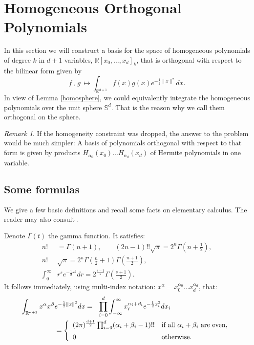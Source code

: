 \documentclass{amsart}
\newcommand{\R}{\mathbb{R}}
\renewcommand{\S}{\mathbb{S}}
\theoremstyle{plain}
\theoremstyle{definition}
\theoremstyle{remark}
\newtheorem{remark}[theorem]{Remark}
\begin{document}
\section{Homogeneous Orthogonal Polynomials}
In this section we will construct a basis for the space of homogeneous polynomials of degree $k$ in $d+1$ variables, $\R[x_0,\ldots,x_d]_k$, that is orthogonal with respect to the bilinear form given by
\begin{equation*}
 f\,,\,g\, \longmapsto \int_{\R^{d+1}}f(x)g(x)e^{-\frac{1}{2}\|x\|^2} dx.
\end{equation*}
In view of Lemma \ref{homosphere}, we could equivalently integrate the homogeneous polynomials over the unit sphere $\S^d$. That is the reason why we call them orthogonal on the sphere.
\begin{remark}
 If the homogeneity constraint was dropped, the answer to the problem would be much simpler: A basis of polynomials orthogonal with respect to that form is given by products $H_{\alpha_0}\!(x_0)\ldots H_{\alpha_d}\!(x_d)$ of Hermite polynomials in one variable.
\end{remark}
\subsection{Some formulas}
We give a few basic definitions and recall some facts on elementary calculus. The reader may also consult \cite{Folland}.

Denote $\Gamma(t)$ the gamma function. It satisfies:
\begin{align}
n!&=\Gamma(n+1),\qquad (2n-1)!!\sqrt{\pi} =2^{n}\Gamma\left(n+\tfrac{1}{2}\right), \\
\label{doublegamma}
n!&\sqrt{\pi}=2^{n}\Gamma\left(\tfrac{n}{2}+1\right)\Gamma\left(\tfrac{n+1}{2}\right) ,\\
\int_0^\infty& r^se^{-\frac{1}{2}r^2} dr = 2^{\frac{s-1}{2}}\Gamma\left(\tfrac{s+1}{2}\right).
\end{align}
It follows immediately, using multi-index notation: $x^\alpha = x_0^{\alpha_0}\ldots x_d^{\alpha_d}$, that:
\begin{align}    \label{monoint}
 \int_{\R^{d+1}}x^\alpha x^\beta & e^{-\frac{1}{2}\|x\|^2} dx = \ \ 
\displaystyle \prod_{i=0}^d \int_{-\infty}^\infty x_i^{\alpha_i+\beta_i} e^{-\frac{1}{2}x_i^2} dx_i \\
 &= \left\{
\begin{array}{*2{l}p{5cm}}
(2 \pi)^{\frac{d+1}{2}}\prod_{i=0}^d (\alpha_i+\beta_i-1)!! &\text{if all }\alpha_i+\beta_i\text{ are even}, \vspace{0.2cm} \\ 
 0 &\text{otherwise}.
\end{array}
  \right.\nonumber
\end{align}
\end{document}
